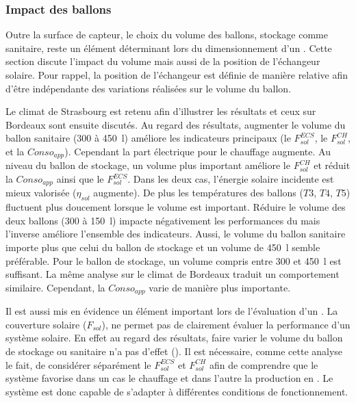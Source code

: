 \subsubsection{Impact des ballons} %
\label{ssub:impact_des_ballons}
Outre la surface de capteur, le choix du volume des ballons, stockage comme sanitaire,
reste un élément déterminant lors du dimensionnement d’un . Cette section discute
l’impact du volume mais aussi de la position de l’échangeur solaire. Pour rappel, la
position de l’échangeur est définie de manière relative afin d’être indépendante des
variations réalisées sur le volume du ballon.

Le climat de Strasbourg est retenu afin d’illustrer les résultats et ceux sur Bordeaux
sont ensuite discutés. Au regard des résultats, augmenter le volume du ballon sanitaire
(\num{300} à \SI{450}{\litre}) améliore les indicateurs principaux (le $F_{sol}^{ECS}$, le
$F_{sol}^{CH}$, et la $Conso_{app}$). Cependant la part électrique pour le chauffage
augmente. Au niveau du ballon de stockage, un volume plus important améliore le $F_{sol}^{CH}$
et réduit la $Conso_{app}$ ainsi que le $F_{sol}^{ECS}$. Dans les deux cas, l’énergie solaire
incidente est mieux valorisée ($\eta_{sol}$ augmente).
De plus les températures des ballons ($T3$, $T4$, $T5$) fluctuent plus doucement lorsque le
volume est important. Réduire le volume des deux ballons (\num{300} à \SI{150}{\litre})
impacte négativement les performances du  mais l’inverse améliore l’ensemble des
indicateurs. Aussi, le volume du ballon sanitaire importe plus que celui du ballon de
stockage et un volume de \SI{450}{\litre} semble préférable. Pour le ballon de stockage,
un volume compris entre \num{300} et \SI{450}{\litre} est suffisant. La même analyse sur
le climat de Bordeaux traduit un comportement similaire. Cependant, la $Conso_{app}$
varie de manière plus importante.

Il est aussi mis en évidence un élément important lors de l’évaluation d’un . La
couverture solaire ($F_{sol}$), ne permet pas de clairement évaluer la performance d’un
système solaire. En effet au regard des résultats, faire varier le volume du ballon de
stockage ou sanitaire n’a pas d’effet (). Il est
nécessaire, comme cette analyse le fait, de considérer séparément le $F_{sol}^{ECS}$ et
$F_{sol}^{CH}$ afin de comprendre que le système favorise dans un cas le chauffage et dans
l’autre la production en . Le système est donc capable de s’adapter à
différentes conditions de fonctionnement.

